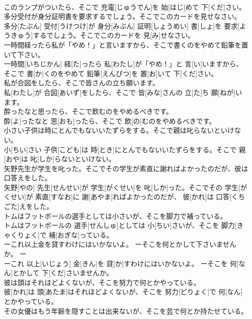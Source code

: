 \documentclass[8pt]{extreport}
\begin{document}
\begin{CJK}{UTF8}{min}
\\	このランプがついたら、そこで 充電[じゅうでん]を 始[はじ]めて 下[くだ]さい。
\\	多分受付が身分証明書を要求するでしょう。そこでこのカードを見せなさい。	
\\	多分[たぶん] 受付[うけつけ]が 身分[みぶん] 証明[しょうめい] 書[しょ]を 要求[ようきゅう]するでしょう。そこでこのカードを 見[み]せなさい。
\\	一時間経ったら私が「やめ！」と言いますから、そこで書くのをやめて鉛筆を置いて下さい。	
\\	一時間[いちじかん] 経[た]ったら 私[わたし]が「やめ！」と 言[い]いますから、そこで 書[か]くのをやめて 鉛筆[えんぴつ]を 置[お]いて 下[くだ]さい。
\\	私が合図をしたら、そこで皆さんの立ち願います。	
\\	私[わたし]が 合図[あいず]をしたら、そこで 皆[みな]さんの 立[た]ち 願[ねが]います。
\\	酔ったなと思ったら、そこで飲むのをやめるべきです。	
\\	酔[よ]ったなと 思[おも]ったら、そこで 飲[の]むのをやめるべきです。
\\	小さい子供は時にとんでもないいたずらをする。そこで親は叱らないといけない。	
\\	小[ちい]さい 子供[こども]は 時[とき]にとんでもないいたずらをする。そこで 親[おや]は 叱[しか]らないといけない。
\\	矢野先生が学生を叱った。そこでその学生が素直に謝ればよかったのだが、彼は口答えをした。	
\\	矢野[やの] 先生[せんせい]が 学生[がくせい]を 叱[しか]った。そこでその 学生[がくせい]が 素直[すなお]に 謝[あやま]ればよかったのだが、 彼[かれ]は 口答[くちごた]えをした。
\\	トムはフットボールの選手としては小さいが、そこを脚力で補っている。	
\\	トムはフットボールの 選手[せんしゅ]としては 小[ちい]さいが、そこを 脚力[きゃくりょく]で 補[おぎな]っている。
\\	ーこれ以上金を貸すわけにはいかないよ。 ーそこを何とかして下さいませんか。	ー
\\	ーこれ 以上[いじょう] 金[きん]を 貸[か]すわけにはいかないよ。 ーそこを 何[なん]とかして 下[くだ]さいませんか。
\\	彼は頭はそれほどよくないが、そこを努力で何とかやっている。	
\\	彼[かれ]は 頭[あたま]はそれほどよくないが、そこを 努力[どりょく]で 何[なん]とかやっている。
\\	その女優はもう年齢を隠すことは出来ないが、そこを芸で何とか持たせている。	

\end{CJK}
\end{document}
